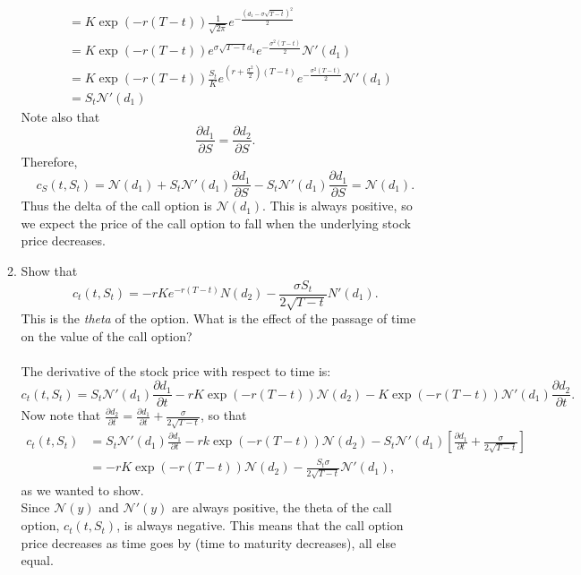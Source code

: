 \documentclass[11pt,a4,table]{article}
\begin{document}
\begin{enumerate}
\begin{enumerate}
\begin{align*}
            &= K \exp(-r(T-t))\frac{1}{\sqrt{2\pi}} e^{-\frac{(d_1-\sigma\sqrt{T-t})^2}{2}}\\
            &= K \exp(-r(T-t))e^{\sigma\sqrt{T-t}d_1}e^{-\frac{\sigma^2(T-t)}{2}}\mathcal{N}'(d_1)\\
            &= K \exp(-r(T-t))\frac{S_t}{K}e^{\left(r+\frac{\sigma^2}{2}\right)(T-t)}e^{-\frac{\sigma^2(T-t)}{2}}\mathcal{N}'(d_1)\\
            &= S_t \mathcal{N}'(d_1)
        \end{align*}
        Note also that
        \begin{equation*}
            \frac{\partial d_1}{\partial S} = \frac{\partial d_2}{\partial S}.
        \end{equation*}
        Therefore,
        \begin{equation*}
            c_S(t,S_t) = \mathcal{N}(d_1) + S_t\mathcal{N}'(d_1) \frac{\partial d_1}{\partial S} - S_t\mathcal{N}'(d_1) \frac{\partial d_1}{\partial S} = \mathcal{N}(d_1).
        \end{equation*}
        Thus the delta of the call option is $\mathcal{N}(d_1)$. This is always positive, so we expect the price of the call option to fall when the underlying stock price decreases.
        
        \item Show that
        \begin{equation}
            c_t(t,S_t) = -rKe^{-r(T-t)}N(d_2) - \frac{\sigma S_t}{2\sqrt{T-t}}N'(d_1).
        \end{equation}
        This is the \textit{theta} of the option. What is the effect of the passage of time on the value of the call option?\\\\
        The derivative of the stock price with respect to time is:
        \begin{equation*}
            c_t(t,S_t) = S_t \mathcal{N}'(d_1) \frac{\partial d_1}{\partial t} - rK \exp(-r(T-t)) \mathcal{N}(d_2) - K \exp(-r(T-t))\mathcal{N}'(d_1) \frac{\partial d_2}{\partial t}.
        \end{equation*}
        Now note that $\frac{\partial d_2}{\partial t}=\frac{\partial d_1}{\partial t} + \frac{\sigma}{2\sqrt{T-t}}$, so that
        \begin{align*}
            c_t(t,S_t) &= S_t\mathcal{N}'(d_1)\frac{\partial d_1}{\partial t} - rk \exp(-r(T-t)) \mathcal{N}(d_2) - S_t\mathcal{N}'(d_1)\left[ \frac{\partial d_1}{\partial t} + \frac{\sigma}{2\sqrt{T-t}}\right]\\
            &= - rK \exp(-r(T-t))\mathcal{N}(d_2) - \frac{S_t\sigma}{2\sqrt{T-t}}\mathcal{N}'(d_1),
        \end{align*}
        as we wanted to show.\\
        Since $\mathcal{N}(y)$ and $\mathcal{N}'(y)$ are always positive, the theta of the call option, $c_t(t,S_t)$, is always negative. This means that the call option price decreases as time goes by (time to maturity decreases), all else equal.
        

\end{enumerate}
\end{enumerate}
\end{document}
